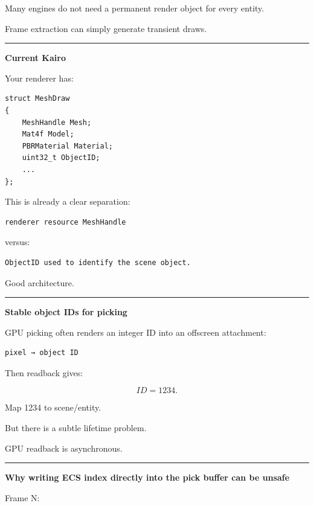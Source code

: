 Many engines do not need a permanent render object for every entity.

Frame extraction can simply generate transient draws.

\begin{center}\rule{0.5\linewidth}{0.5pt}\end{center}

\textbf{Current Kairo }

Your renderer has:

\begin{verbatim}
struct MeshDraw
{
    MeshHandle Mesh;
    Mat4f Model;
    PBRMaterial Material;
    uint32_t ObjectID;
    ...
};
\end{verbatim}

This is already a clear separation:

\begin{verbatim}
renderer resource MeshHandle
\end{verbatim}

versus:

\begin{verbatim}
ObjectID used to identify the scene object.
\end{verbatim}

Good architecture.

\begin{center}\rule{0.5\linewidth}{0.5pt}\end{center}

\textbf{Stable object IDs for picking}

GPU picking often renders an integer ID into an offscreen attachment:

\begin{verbatim}
pixel → object ID
\end{verbatim}

Then readback gives:

\[
ID=1234.
\]

Map 1234 to scene/entity.

But there is a subtle lifetime problem.

GPU readback is asynchronous.

\begin{center}\rule{0.5\linewidth}{0.5pt}\end{center}

\textbf{Why writing ECS index directly into the pick buffer can be unsafe}

Frame N:

